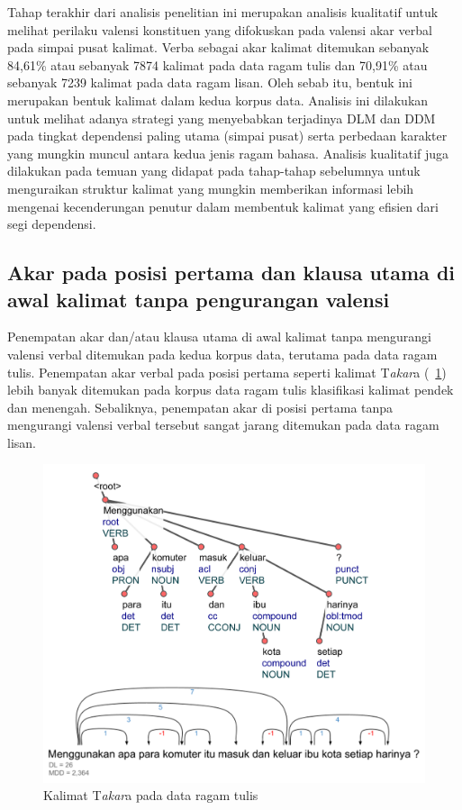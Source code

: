 Tahap terakhir dari analisis penelitian ini merupakan analisis kualitatif untuk melihat perilaku valensi konstituen yang difokuskan pada valensi akar verbal pada simpai pusat kalimat. Verba sebagai akar kalimat ditemukan sebanyak 84,61\% atau sebanyak 7874 kalimat pada data ragam tulis dan 70,91\% atau sebanyak 7239 kalimat pada data ragam lisan. Oleh sebab itu, bentuk ini merupakan bentuk kalimat dalam kedua korpus data. Analisis ini dilakukan untuk melihat adanya strategi yang menyebabkan terjadinya DLM dan DDM pada tingkat dependensi paling utama (simpai pusat) serta perbedaan karakter yang mungkin muncul antara kedua jenis ragam bahasa. Analisis kualitatif juga dilakukan pada temuan yang didapat pada tahap-tahap sebelumnya untuk menguraikan struktur kalimat yang mungkin memberikan informasi lebih mengenai kecenderungan penutur dalam membentuk kalimat yang efisien dari segi dependensi.

\subsection{Akar pada posisi pertama dan klausa utama di awal kalimat tanpa pengurangan valensi}
Penempatan akar dan/atau klausa utama di awal kalimat tanpa mengurangi valensi verbal ditemukan pada kedua korpus data, terutama pada data ragam tulis. Penempatan akar verbal pada posisi pertama seperti kalimat T\textit{akar}a (\pic~\ref{fig:ts7458}) lebih banyak ditemukan pada korpus data ragam tulis klasifikasi kalimat pendek dan menengah. Sebaliknya, penempatan akar di posisi pertama tanpa mengurangi valensi verbal tersebut sangat jarang ditemukan pada data ragam lisan.

\begin{figure}
\centering
  \includegraphics[width=.7\textwidth]{pics/ts7458.jpg} 
	\caption{Kalimat T\textit{akar}a pada data ragam tulis}
	\label{fig:ts7458} 
\end{figure}

